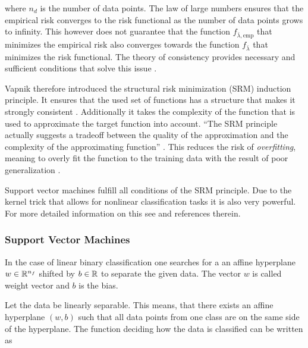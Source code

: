 where \(n_d\) is the number of data points.
The law of large numbers ensures that the empirical risk converges to the risk functional as the number of data points grows to infinity. This however does not guarantee that the function \(f_{\bar{\lambda},\text{emp}}\) that minimizes the empirical risk also converges towards the function \(f_{\bar{\lambda}}\) that minimizes the risk functional.
The theory of consistency provides necessary and sufficient conditions that solve this issue  \cite[p. 989]{Vapnik1999}.

Vapnik therefore introduced the structural risk minimization (SRM) induction principle. It ensures that the used set of functions has a structure that makes it strongly consistent \cite{Vapnik1999}. Additionally it takes the complexity of the function that is used to approximate the target function into account. ``The SRM principle actually suggests a tradeoff between the quality of the approximation and the complexity of the approximating function'' \cite[p. 994]{Vapnik1999}.
This reduces the risk of \emph{overfitting}, meaning to overly fit the function to the training data with the result of poor generalization \cite[chapter 1.3]{Cristianini2000}.


Support vector machines fulfill all conditions of the SRM principle. Due to the kernel trick that allows for nonlinear classification tasks it is also very powerful. For more detailed information on this see \cite{Kunapuli2008} and references therein.

\subsubsection{Support Vector Machines}

In the case of linear binary classification one searches for a an affine hyperplane \(w \in \mathbb{R}^{n_f}\) shifted by \(b \in \mathbb{R}\) to separate the given data. The vector \(w\) is called weight vector and \(b\) is the bias.

Let the data be linearly separable. This means, that there exists an affine hyperplane \((w,b)\) such that all data points from one class are on the same side of the hyperplane. The function deciding how the data is classified can be written as

